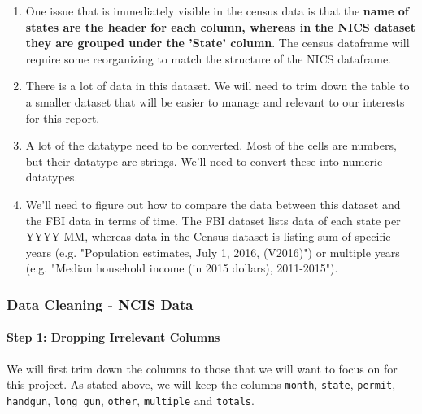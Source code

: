 \documentclass[11pt]{article}
\providecommand{\tightlist}{%
      \setlength{\itemsep}{0pt}\setlength{\parskip}{0pt}}
\begin{document}
\begin{enumerate}
\def\labelenumi{\arabic{enumi}.}
\tightlist
\item
  One issue that is immediately visible in the census data is that the
  \textbf{name of states are the header for each column, whereas in the
  NICS dataset they are grouped under the 'State' column}. The census
  dataframe will require some reorganizing to match the structure of the
  NICS dataframe.
\item
  There is a lot of data in this dataset. We will need to trim down the
  table to a smaller dataset that will be easier to manage and relevant
  to our interests for this report.
\item
  A lot of the datatype need to be converted. Most of the cells are
  numbers, but their datatype are strings. We'll need to convert these
  into numeric datatypes.
\item
  We'll need to figure out how to compare the data between this dataset
  and the FBI data in terms of time. The FBI dataset lists data of each
  state per YYYY-MM, whereas data in the Census dataset is listing sum
  of specific years (e.g. "Population estimates, July 1, 2016, (V2016)")
  or multiple years (e.g. "Median household income (in 2015 dollars),
  2011-2015").
\end{enumerate}

    \subsubsection{Data Cleaning - NCIS
Data}\label{data-cleaning---ncis-data}

    \paragraph{Step 1: Dropping Irrelevant
Columns}\label{step-1-dropping-irrelevant-columns}

We will first trim down the columns to those that we will want to focus
on for this project. As stated above, we will keep the columns
\texttt{month}, \texttt{state}, \texttt{permit}, \texttt{handgun},
\texttt{long\_gun}, \texttt{other}, \texttt{multiple} and
\texttt{totals}.
\end{document}
